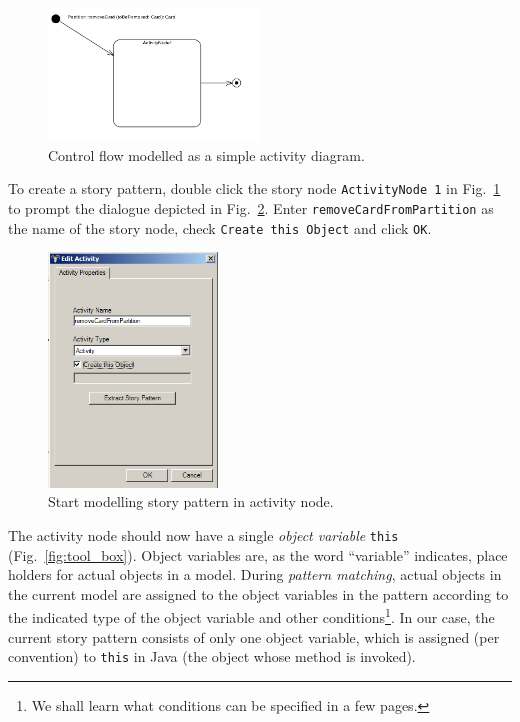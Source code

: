 \begin{figure}[htp]
\begin{center}
  \includegraphics[width=0.5\textwidth]{pics/sdmBilder/removeCard/sdm06RAW}
  \caption{Control flow modelled as a simple activity diagram.}  
  \label{fig:sdm_complete_control_flow_simple}
\end{center}
\end{figure}

To create a story pattern, double click the story node \texttt{ActivityNode 1}
in Fig.~\ref{fig:sdm_complete_control_flow_simple} to prompt the dialogue
depicted in Fig.~\ref{fig:story_pattern}.  Enter
\texttt{remove\-Card\-From\-Partition} as the name of the story node, check
\texttt{Create this Object} and click \texttt{OK}.

\begin{figure}[htp]
\begin{center} 
  \includegraphics[width=0.4\textwidth]{pics/sdmBilder/removeCard/sdm07RAW}
  \caption{Start modelling story pattern in activity node.}  
  \label{fig:story_pattern}
\end{center}
\end{figure}

The activity node should now have a single \emph{object variable} \texttt{this}
(Fig.~\ref{fig:tool_box}). Object variables are, as the word ``variable'' indicates,
place holders for actual objects in a model.  During \emph{pattern matching},
actual objects in the  current model are assigned to the object variables in the
pattern according to  the indicated type of the object variable and other
conditions\footnote{We shall learn what conditions can be specified in a
few pages.}. In our case, the current story pattern consists of only one object
variable, which is assigned (per convention) to \texttt{this} in Java (the
object whose method is invoked).

